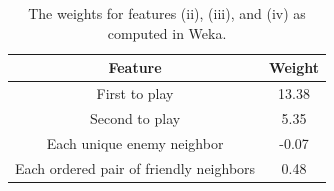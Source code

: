 \documentclass[letterpaper]{article}
\numberwithin{equation}{section}
\numberwithin{theorem}{section}
\numberwithin{lemma}{section}
\numberwithin{df}{section}
\begin{document}

\begin{table}[t]
	\centering
		\caption{The weights for features (ii), (iii), and (iv) as computed in Weka.} 
		\label{tab:MoreScoring}
		\begin{tabular}{|c|c|}
			\hline
			\textbf{Feature} & \textbf{Weight} \\
			\hline
			First to play & 13.38 \\
			\hline
			Second to play & 5.35 \\
			\hline
			Each unique enemy neighbor & -0.07 \\
			\hline
			Each ordered pair of friendly neighbors & 0.48 \\
			\hline
		\end{tabular}
	
\end{table}
\end{document}
